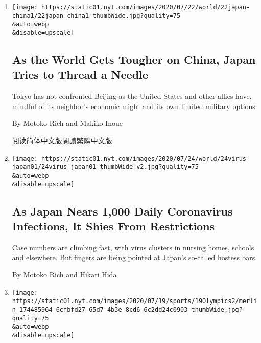 \begin{enumerate}
\def\labelenumi{\arabic{enumi}.}
\item
  \href{/2020/07/25/world/asia/japan-china-xi.html}{}

  \texttt{[image: https://static01.nyt.com/images/2020/07/22/world/22japan-china1/22japan-china1-thumbWide.jpg?quality=75\\\&auto=webp\\\&disable=upscale]}

  \hypertarget{as-the-world-gets-tougher-on-china-japan-tries-to-thread-a-needle}{%
  \subsection{As the World Gets Tougher on China, Japan Tries to Thread
  a
  Needle}\label{as-the-world-gets-tougher-on-china-japan-tries-to-thread-a-needle}}

  Tokyo has not confronted Beijing as the United States and other allies
  have, mindful of its neighbor's economic might and its own limited
  military options.

  By Motoko Rich and Makiko Inoue

  \href{https://cn.nytimes.com/asia-pacific/20200727/japan-china-xi/}{阅读简体中文版}\href{https://cn.nytimes.com/asia-pacific/20200727/japan-china-xi/zh-hant/}{閱讀繁體中文版}
\item
  \href{/2020/07/24/world/asia/japan-coronavirus.html}{}

  \texttt{[image: https://static01.nyt.com/images/2020/07/24/world/24virus-japan01/24virus-japan01-thumbWide-v2.jpg?quality=75\\\&auto=webp\\\&disable=upscale]}

  \hypertarget{as-japan-nears-1000-daily-coronavirus-infections-it-shies-from-restrictions}{%
  \subsection{As Japan Nears 1,000 Daily Coronavirus Infections, It
  Shies From
  Restrictions}\label{as-japan-nears-1000-daily-coronavirus-infections-it-shies-from-restrictions}}

  Case numbers are climbing fast, with virus clusters in nursing homes,
  schools and elsewhere. But fingers are being pointed at Japan's
  so-called hostess bars.

  By Motoko Rich and Hikari Hida
\item
  \href{/2020/07/19/sports/2021-tokyo-olympics-protocols.html}{}

  \texttt{[image: https://static01.nyt.com/images/2020/07/19/sports/19Olympics2/merlin\_174485964\_6cfbfd27-65d7-4b3e-8cd6-6c2dd24c0903-thumbWide.jpg?quality=75\\\&auto=webp\\\&disable=upscale]}


\end{enumerate}
